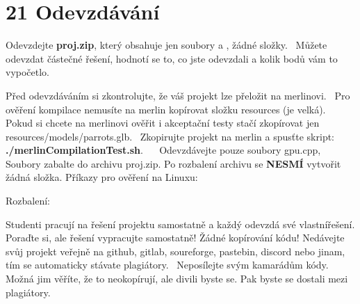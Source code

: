 \chapter{21 Odevzdávání}
\hypertarget{p21_odevzdavani}{}\label{p21_odevzdavani}
Odevzdejte {\bfseries{proj.\+zip}}, který obsahuje jen soubory  a , žádné složky.~\newline
 Můžete odevzdat částečné řešení, hodnotí se to, co jste odevzdali a kolik bodů vám to vypočetlo.~\newline


Před odevzdáváním si zkontrolujte, že váš projekt lze přeložit na merlinovi.~\newline
 Pro ověření kompilace nemusíte na merlin kopírovat složku resources (je velká).~\newline
 Pokud si chcete na merlinovi ověřit i akceptační testy stačí zkopírovat jen resources/models/parrots.\+glb.~\newline
 Zkopirujte projekt na merlin a spusťte skript\+: {\bfseries{./merlin\+Compilation\+Test.sh}}.~\newline
~\newline
 Odevzdávejte pouze soubory gpu.\+cpp,  Soubory zabalte do archivu proj.\+zip. Po rozbalení archivu se {\bfseries{NESMÍ}} vytvořit žádná složka. Příkazy pro ověření na Linuxu\+: 
\begin{DoxyCode}{0}

\end{DoxyCode}
 Rozbalení\+: 
\begin{DoxyCode}{0}

\end{DoxyCode}
 Studenti pracují na řešení projektu samostatně a každý odevzdá své vlastnířešení. Poraďte si, ale řešení vypracujte samostatně! Žádné kopírování kódu! Nedávejte svůj projekt veřejně na github, gitlab, soureforge, pastebin, discord nebo jinam, tím se automaticky stávate plagiátory.~\newline
 Neposílejte svým kamarádům kódy. Možná jim věříte, že to neokopírují, ale divili byste se. Pak byste se dostali mezi plagiátory. 
